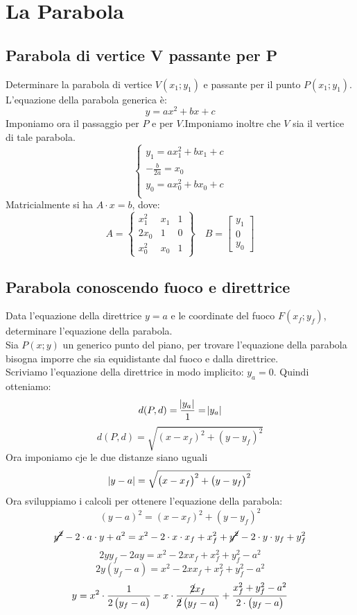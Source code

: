 \documentclass[12pt]{book}
\begin{document}
	\chapter{La Parabola}
			\section{Parabola di vertice V passante per P}
			Determinare la parabola di vertice $V(x_1;y_1)$ e passante per il punto $P(x_1;y_1)$.\\
			L'equazione della parabola generica è:
			\[y=ax^2+bx+c\]
			Imponiamo ora il passaggio per $P$ e per $V$.Imponiamo inoltre che $V$ sia il vertice di tale parabola.
			$$\begin{cases}
				y_1=ax_1^2+bx_1+c\\
				-\frac{b}{2a}=x_0\\
				y_0=ax_0^2+bx_0+c\\
			\end{cases}$$
			Matricialmente si ha $A\cdot x=b$, dove:
			\[A=\begin{Bmatrix}
				x_1^2 & x_1& 1\\
				2x_0 & 1 & 0\\
				x_0^2 & x_0 &1
			\end{Bmatrix}
			\quad
			B=\begin{bmatrix}
				y_1 \\ 0 \\y_0
			\end{bmatrix}
			\]
			
			\section{Parabola conoscendo fuoco e direttrice}
			Data l’equazione della direttrice $y=a$ e le coordinate del fuoco $F(x_f;y_f)$, determinare l'equazione della parabola.\\
			Sia $P(x;y)$ un generico punto del piano, per trovare l'equazione della parabola bisogna imporre che sia equidistante dal fuoco e dalla direttrice.\\
			Scriviamo l'equazione della direttrice in modo implicito: $y_a=0$. Quindi otteniamo:
			\[d(P,d)=\frac{\abs{y_a}}{1}=\abs{y_a}\]
			\[d(P,d)=\sqrt{\left(x-x_f\right)^2+\left(y-y_f\right)^2}\]
			Ora imponiamo cje le due distanze siano uguali
			\[\abs{y-a}=\sqrt{\left(x-x_f\right)^2+\left(y-y_f\right)^2}\]
			Ora sviluppiamo i calcoli per ottenere l'equazione della parabola:
			\[\left(y-a\right)^2=\left(x-x_f\right)^2+\left(y-y_f\right)^2\]
			\[\cancel{y^2}-2\cdot a\cdot y+a^2=x^2-2\cdot x \cdot x_f + x_f^2+\cancel{y^2}-2\cdot y \cdot y_f+y_f^2\]
			\[2yy_f-2ay=x^2-2xx_f+x_f^2+y_f^2-a^2\]
			\[2y\left(y_f-a\right)=x^2-2xx_f+x_f^2+y_f^2-a^2\]
			\[y=x^2\cdot\frac{1}{2\left(y_f-a\right)}-x\cdot\frac{\cancel{2}x_f}{\cancel{2}\left(y_f-a\right)}+\frac{x_f^2+y_f^2-a^2}{2\cdot\left(y_f-a\right)}\]
			
\end{document}

